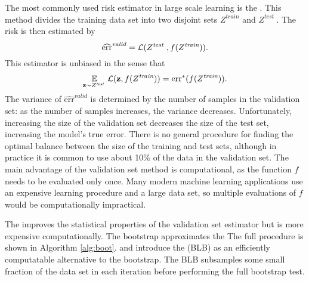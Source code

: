 \documentclass[thesis.tex]{subfiles}
\newcommand{\riskstar}{{\textrm{err}^*}}
\newcommand{\riskvalid}{\widehat{\textrm{err}}^\textit{valid}}
\begin{document}
\newcommand{\Ztrain}{Z^\textit{train}}
\newcommand{\Ztest }{Z^\textit{test }}
\newcommand{\ntrain}{n^\textit{train}}
\newcommand{\ntest }{n^\textit{test }}
The most commonly used risk estimator in large scale learning is the .
This method divides the training data set into two disjoint sets $\Ztrain$ and $\Ztest$.
The risk is then estimated by
\begin{equation}
    \riskvalid = \Loss(\Ztest,f(\Ztrain))
    .
\end{equation}
This estimator is unbiased in the sense that
\begin{equation}
    \E_{\z\sim\Ztest}\Loss(\z,f(\Ztrain)) = \riskstar(f(\Ztrain))
    .
\end{equation}
The variance of $\riskvalid$ is determined by the number of samples in the validation set:
as the number of samples increases, the variance decreases.
Unfortunately, increasing the size of the validation set decreases the size of the test set,
increasing the model's true error.
There is no general procedure for finding the optimal balance between the size of the training and test sets,
although in practice it is common to use about 10\% of the data in the validation set.
The main advantage of the validation set method is computational,
as the function $f$ needs to be evaluated only once.
Many modern machine learning applications use an expensive learning procedure and a large data set,
so multiple evaluations of $f$ would be computationally impractical.


The  improves the statistical properties of the validation set estimator but is more expensive computationally.
The bootstrap approximates the 
The full procedure is shown in Algorithm \ref{alg:boot}.
\citet{kleiner2012big} and \citet{kleiner2014scalable} introduce the  (BLB) as an efficiently computatable alternative to the bootstrap.
The BLB subsamples some small fraction of the data set in each iteration before performing the full bootstrap test.
\end{document}
